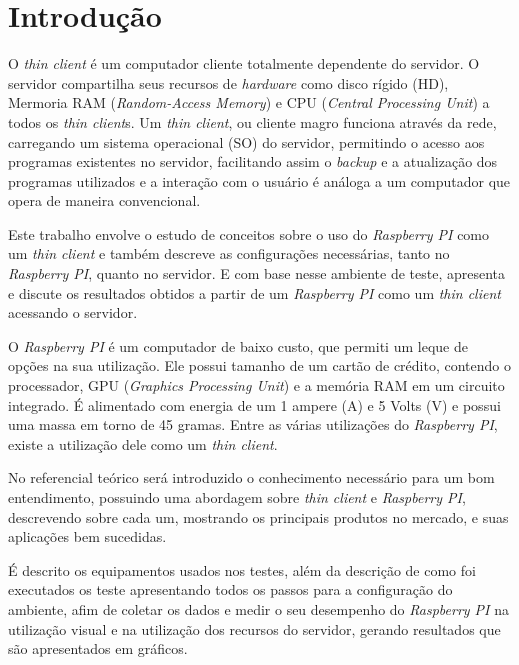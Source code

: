 \chapter{Introdução}



O \textit{thin client} é um computador cliente totalmente dependente do servidor. O servidor compartilha seus recursos de \textit{hardware} como disco rígido (HD), Mermoria RAM (\textit{Random-Access Memory}) e CPU (\textit{Central Processing Unit}) a todos os \textit{thin client}s. Um \textit{thin client}, ou cliente magro funciona através da rede, carregando um sistema operacional (SO) do servidor, permitindo o acesso aos programas existentes no servidor, facilitando assim o \textit{backup} e a atualização dos programas utilizados e a interação com o usuário é análoga a um computador que opera de maneira convencional.

Este trabalho envolve o estudo de conceitos sobre o uso do \textit{Raspberry PI} como um \textit{thin client} e também descreve as configurações necessárias, tanto no \textit{Raspberry PI}, quanto no servidor. E com base nesse ambiente de teste, apresenta e discute os resultados obtidos a partir de um \textit{Raspberry PI} como um \textit{thin client} acessando o servidor.

O \textit{Raspberry PI} é um computador de baixo custo, que permiti um leque de opções na sua utilização. Ele possui tamanho de um cartão de crédito, contendo o processador, GPU (\textit{Graphics Processing Unit}) e a memória RAM em um circuito integrado. É alimentado com energia de um 1 ampere (A) e 5 Volts (V) e possui uma massa em torno de 45 gramas. Entre as várias utilizações do \textit{Raspberry PI}, existe a utilização dele como um  \textit{thin client}.

No referencial teórico será introduzido o conhecimento necessário para um bom entendimento, possuindo uma abordagem sobre  \textit{thin client} e \textit{Raspberry PI}, descrevendo sobre cada um, mostrando os principais produtos no mercado, e suas aplicações bem sucedidas. 

É descrito os equipamentos usados nos testes, além da descrição de como foi executados os teste apresentando todos os passos para a configuração do ambiente, afim de coletar os dados e medir o seu desempenho do \textit{Raspberry PI} na utilização visual e na utilização dos recursos do servidor, gerando resultados que são apresentados em gráficos.

